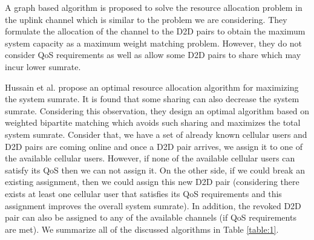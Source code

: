 \documentclass[times]{dacauth}
\begin{document}
\smallskip
\noindent
A graph based algorithm \cite{zhang} is proposed to solve the resource allocation problem in the uplink channel which is similar to the problem we are considering. They formulate the allocation of the channel to the D2D pairs to obtain the maximum system capacity as a maximum weight matching problem. However, they do not consider QoS requirements as well as allow some D2D pairs to share which may incur lower sumrate.
 
\smallskip
\noindent
Hussain et al. \cite{ccnc} propose an optimal resource allocation algorithm for maximizing the system sumrate. It is found that some sharing can also decrease the system sumrate. Considering this observation, they design an optimal algorithm based on weighted bipartite matching which avoids such sharing and maximizes the total system sumrate. Consider that, we have a set of already known cellular users and D2D pairs are coming online and once a D2D pair arrives, we assign it to one of the available cellular users. However, if none of the available cellular users can satisfy its QoS then we can not assign it. On the other side, if we could break an existing assignment, then we could assign this new D2D pair (considering there exists at least one cellular user that satisfies its QoS requirements and this assignment improves the overall system sumrate). In addition, the revoked D2D pair can also be assigned to any of the available channels (if QoS requirements are met). We summarize all of the discussed algorithms in Table \ref{table:1}.
\end{document}
